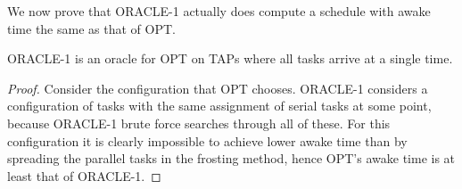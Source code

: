 We now prove that ORACLE-1 actually does compute a schedule with
awake time the same as that of OPT.
\begin{lemma}
  \label{lem:frosting} 
  ORACLE-1 is an oracle for OPT on TAPs where all tasks arrive at a single time.
\end{lemma}
\begin{proof}
  Consider the configuration that OPT chooses. ORACLE-1 considers
  a configuration of tasks with the same assignment of serial
  tasks at some point, because ORACLE-1 brute force searches
  through all of these. For this configuration it is clearly
  impossible to achieve lower awake time than by spreading the
  parallel tasks in the frosting method, hence OPT's awake time
  is at least that of ORACLE-1.
\end{proof}

